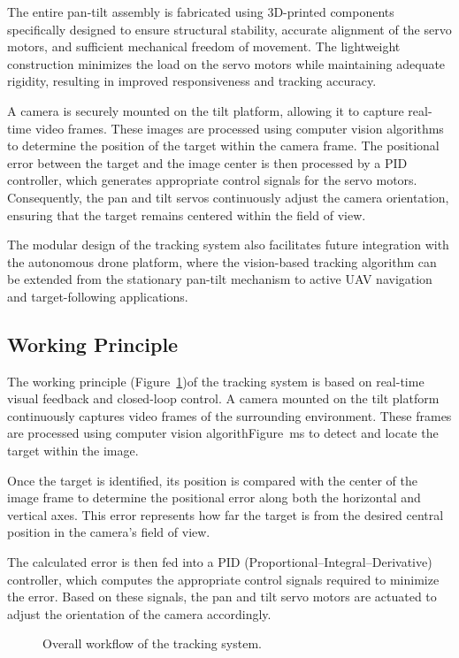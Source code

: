 \documentclass[12pt]{article}
\begin{document}
{The entire pan-tilt assembly is fabricated using 3D-printed components specifically designed to ensure structural stability, accurate alignment of the servo motors, and sufficient mechanical freedom of movement. The lightweight construction minimizes the load on the servo motors while maintaining adequate rigidity, resulting in improved responsiveness and tracking accuracy.

A camera is securely mounted on the tilt platform, allowing it to capture real-time video frames. These images are processed using computer vision algorithms to determine the position of the target within the camera frame. The positional error between the target and the image center is then processed by a PID controller, which generates appropriate control signals for the servo motors. Consequently, the pan and tilt servos continuously adjust the camera orientation, ensuring that the target remains centered within the field of view.

The modular design of the tracking system also facilitates future integration with the autonomous drone platform, where the vision-based tracking algorithm can be extended from the stationary pan-tilt mechanism to active UAV navigation and target-following applications.
\subsection{Working Principle}
The working principle (Figure~\ref{fig:Workflow})of the tracking system is based on real-time visual feedback and closed-loop control. A camera mounted on the tilt platform continuously captures video frames of the surrounding environment. These frames are processed using computer vision algorithFigure~ms to detect and locate the target within the image.

Once the target is identified, its position is compared with the center of the image frame to determine the positional error along both the horizontal and vertical axes. This error represents how far the target is from the desired central position in the camera’s field of view.

The calculated error is then fed into a PID (Proportional–Integral–Derivative) controller, which computes the appropriate control signals required to minimize the error. Based on these signals, the pan and tilt servo motors are actuated to adjust the orientation of the camera accordingly.
\begin{figure}[H]
\centering

\caption{Overall workflow of the tracking system.}
\label{fig:Workflow}
\end{figure}

}
\end{document}
